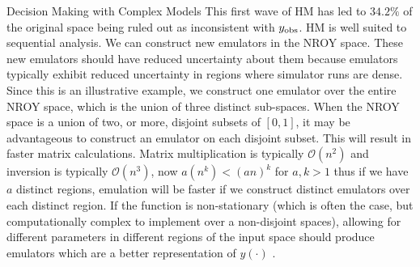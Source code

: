 \begin{chapter}{Decision Making with Complex Models \label{Chap:optimisation}}
This first wave of HM has led to $34.2\%$ of the original space being ruled out as inconsistent with $y_{\text{obs}}$. HM is well suited to sequential analysis. We can construct new emulators in the NROY space. These new emulators should have reduced uncertainty about them because emulators typically exhibit reduced uncertainty in regions where simulator runs are dense. Since this is an illustrative example, we construct one emulator over the entire NROY space, which is the union of three distinct sub-spaces. When the NROY space is a union of two, or more, disjoint subsets of $[0,1]$, it may be advantageous to construct an emulator on each disjoint subset. This will result in faster matrix calculations. Matrix multiplication is typically $\mathcal{O}(n^2)$ and inversion is typically $\mathcal{O}(n^3)$, now $a(n^k) < (an)^k$ for $a, k > 1$ thus if we have $a$ distinct regions, emulation will be faster if we construct distinct emulators over each distinct region. If the function is non-stationary (which is often the case, but computationally complex to implement over a non-disjoint spaces), allowing for different parameters in different regions of the input space should produce emulators which are a better representation of $y(\cdot)$ \citep{Gramacy2008}.


\end{chapter}
